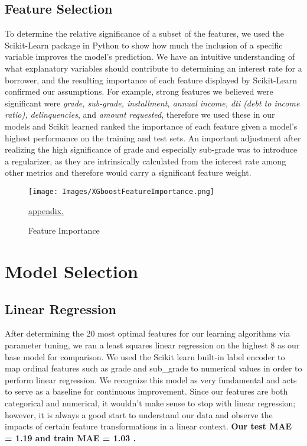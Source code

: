 \documentclass[twocolumn]{article}
\begin{document}
\subsection{Feature Selection}
\par{\hspace{18}To determine the relative significance of a subset of the features, we used the Scikit-Learn package in Python to show how much the inclusion of a specific variable improves the model’s prediction. We have an intuitive understanding of what explanatory variables should contribute to determining an interest rate for a borrower, and the resulting importance of each feature displayed by Scikit-Learn confirmed our assumptions. For example, strong features we believed were significant were \textit{grade, sub-grade, installment, annual income, dti (debt to income ratio), delinquencies}, and  \textit{amount requested}, therefore we used these in our models and Scikit learned ranked the importance of each feature given a model’s highest performance on the training and test sets. An important adjustment after realizing the high significance of grade and especially sub-grade was to introduce a regularizer, as they are intrinsically calculated from the interest rate among other metrics and therefore would carry a significant feature weight. }

\begin{figure}[h!]
\centering
\texttt{[image: Images/XGboostFeatureImportance.png]}
\caption{Feature Importance}
\hyperref[sec:pseudo]{\underline{appendix.}}
\end{figure}

\section{Model Selection}

\subsection{Linear Regression}

\par{\hspace{18}After determining the 20 most optimal features for our learning algorithms via parameter tuning, we ran a least squares linear regression on the highest 8 as our base model for comparison. We used the Scikit learn built-in label encoder to map ordinal features such as grade and sub\_grade to numerical values in order to perform linear regression. We recognize this model as very fundamental and acts to serve as a baseline for continuous improvement. Since our features are both categorical and numerical, it wouldn’t make sense to stop with linear regression; however, it is always a good start to understand our data and observe the impacts of certain feature transformations in a linear context.   \textbf{Our test MAE = 1.19 and train MAE =  1.03 .}
}
\end{document}
